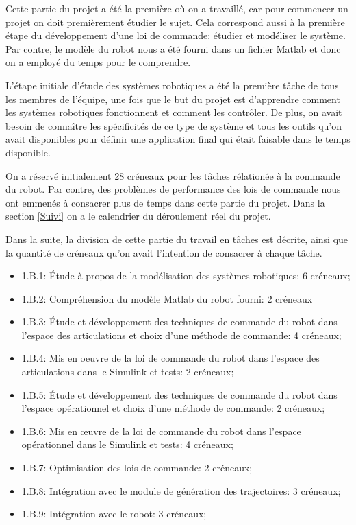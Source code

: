 
Cette partie du projet a été la première où on a travaillé, car pour commencer un projet on doit premièrement étudier le sujet. Cela correspond aussi à la première étape du développement d'une loi de commande: étudier et modéliser le système. Par contre, le modèle du robot nous a été fourni dans un fichier Matlab et donc on a employé du temps pour le comprendre. 

L'étape initiale d'étude des systèmes robotiques a été la première tâche de tous les membres de l'équipe, une fois que le but du projet est d'apprendre comment les systèmes robotiques fonctionnent et comment les contrôler. De plus, on avait besoin de connaître les spécificités de ce type de système et tous les outils qu'on avait disponibles pour définir une application final qui était faisable dans le temps disponible. 

On a réservé initialement 28 créneaux pour les tâches rélationée à la commande du robot. Par contre, des problèmes de performance des lois de commande nous ont emmenés à consacrer plus de temps dans cette partie du projet. Dans la section \ref{Suivi} on a le calendrier du déroulement réel du projet. 

Dans la suite, la division de cette partie du travail en tâches est décrite, ainsi que la quantité de créneaux qu'on avait l'intention de consacrer à chaque tâche.

\begin{itemize}
\item 1.B.1: Étude à propos de la modélisation des systèmes robotiques: 6 créneaux;

\item 1.B.2: Compréhension du modèle Matlab du robot fourni: 2 créneaux

\item 1.B.3: Étude et développement des techniques de commande du robot dans l'espace des articulations et choix d'une méthode de commande: 4 créneaux;

\item 1.B.4: Mis en oeuvre de la loi de commande du robot dans l'espace des articulations dans le Simulink et tests: 2 créneaux;

\item 1.B.5: Étude et développement des techniques de commande du robot dans l'espace opérationnel et choix d'une méthode de commande: 2 créneaux;

\item 1.B.6: Mis en \oe{}uvre de la loi de commande du robot dans l'espace opérationnel dans le Simulink et tests: 4 créneaux;

\item 1.B.7: Optimisation des lois de commande: 2 créneaux;

\item 1.B.8: Intégration avec le module de génération des trajectoires: 3 créneaux;

\item 1.B.9: Intégration avec le robot: 3 créneaux;

\end{itemize} 

